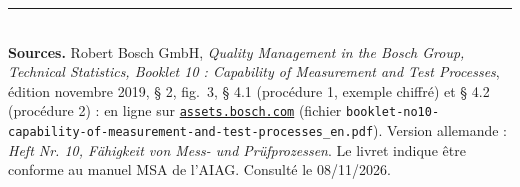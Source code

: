 \documentclass[10pt,a4paper]{article}
\begin{document}
\vfill
{\footnotesize\color{uimm}\rule{\linewidth}{0.4pt}\\
\textbf{Sources.} Robert Bosch GmbH, \emph{Quality Management in the Bosch Group, Technical Statistics, Booklet 10 : Capability of Measurement and Test Processes}, édition novembre 2019, § 2, fig.~3, § 4.1 (procédure 1, exemple chiffré) et § 4.2 (procédure 2) :
en ligne sur \href{https://assets.bosch.com/media/global/bosch_group/purchasing_and_logistics/information_for_business_partners/downloads/quality_docs/general_regulations/bosch_publications/booklet-no10-capability-of-measurement-and-test-processes_en.pdf}{\texttt{assets.bosch.com}} (fichier \texttt{booklet-no10-capability-of-measurement-and-test-processes\_en.pdf}).
Version allemande : \emph{Heft Nr. 10, Fähigkeit von Mess- und Prüfprozessen}. Le livret indique être conforme au manuel MSA de l'AIAG. Consulté le 08/11/2026.}
\end{document}
